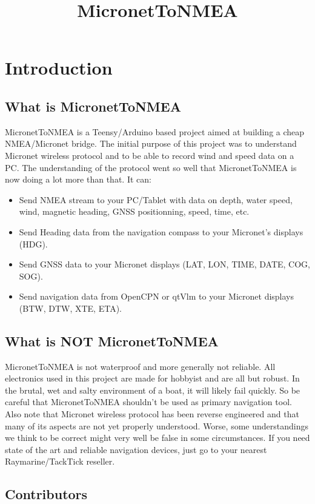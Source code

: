 \documentclass{report}
\begin{document}
\title{MicronetToNMEA}

\chapter {Introduction}

\section{What is MicronetToNMEA}

MicronetToNMEA is a Teensy/Arduino based project aimed at building a cheap NMEA/Micronet bridge. The initial purpose of this project was to understand Micronet wireless protocol and to be able to record wind and speed data on a PC. The understanding of the protocol went so well that MicronetToNMEA is now doing a lot more than that. It can:

\begin{itemize}
\item Send NMEA stream to your PC/Tablet with data on depth, water speed, wind, magnetic heading, GNSS positionning, speed, time, etc.
\item Send Heading data from the navigation compass to your Micronet's displays (HDG).
\item Send GNSS data to your Micronet displays (LAT, LON, TIME, DATE, COG, SOG).
\item Send navigation data from OpenCPN or qtVlm to your Micronet displays (BTW, DTW, XTE, ETA).
\end{itemize}

\section{What is NOT MicronetToNMEA}

MicronetToNMEA is not waterproof and more generally not reliable. All electronics used in this project are made for hobbyist and are all but robust. In the brutal, wet and salty environment of a boat, it will likely fail quickly. So be careful that MicronetToNMEA shouldn’t be used as primary navigation tool. Also note that Micronet wireless protocol has been reverse engineered and that many of its aspects are not yet properly understood. Worse, some understandings we think to be correct might very well be false in some circumstances. If you need state of the art and reliable navigation devices, just go to your nearest Raymarine/TackTick reseller.

\section{Contributors}
\end{document}
